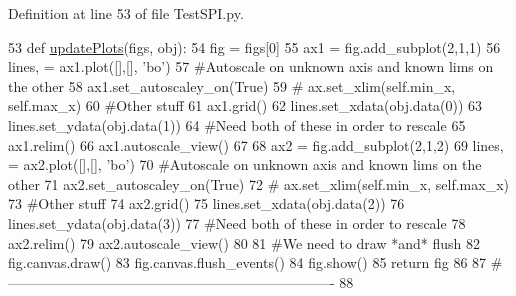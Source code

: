 Definition at line 53 of file Test\+S\+P\+I.\+py.


\begin{DoxyCode}
53 \textcolor{keyword}{def }\hyperlink{namespaceTestSPI_a3663ea314c061192225a8256794f56c9}{updatePlots}(figs, obj):
54     fig = figs[0]
55     ax1 = fig.add\_subplot(2,1,1)
56     lines, = ax1.plot([],[], \textcolor{stringliteral}{'bo'})
57     \textcolor{comment}{#Autoscale on unknown axis and known lims on the other}
58     ax1.set\_autoscaley\_on(\textcolor{keyword}{True})
59 \textcolor{comment}{#    ax.set\_xlim(self.min\_x, self.max\_x)}
60     \textcolor{comment}{#Other stuff}
61     ax1.grid()        
62     lines.set\_xdata(obj.data(0))
63     lines.set\_ydata(obj.data(1))
64     \textcolor{comment}{#Need both of these in order to rescale}
65     ax1.relim()
66     ax1.autoscale\_view()
67 
68     ax2 = fig.add\_subplot(2,1,2)
69     lines, = ax2.plot([],[], \textcolor{stringliteral}{'bo'})
70     \textcolor{comment}{#Autoscale on unknown axis and known lims on the other}
71     ax2.set\_autoscaley\_on(\textcolor{keyword}{True})
72 \textcolor{comment}{#    ax.set\_xlim(self.min\_x, self.max\_x)}
73     \textcolor{comment}{#Other stuff}
74     ax2.grid()        
75     lines.set\_xdata(obj.data(2))
76     lines.set\_ydata(obj.data(3))
77     \textcolor{comment}{#Need both of these in order to rescale}
78     ax2.relim()
79     ax2.autoscale\_view()
80 
81     \textcolor{comment}{#We need to draw *and* flush}
82     fig.canvas.draw()
83     fig.canvas.flush\_events()
84     fig.show()
85     \textcolor{keywordflow}{return} fig
86     
87 \textcolor{comment}{#----------------------------------------------------------------------}
88 
\end{DoxyCode}
